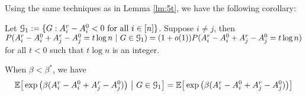 \documentclass{article}
\begin{document}
Using the same techniques as in Lemma \ref{lm:5t}, we have the following corollary:
\begin{corollary}\label{lem:ucBA}
Let $\mathcal{G}_1:=\{G:A^r_i-A^0_i<0\text{~for all~}i\in[n]\}$. Suppose $i\neq j$, then $P(A^r_i-A^0_i + A^r_j - A^0_j= t\log n~|~G\in\mathcal{G}_1)= (1+o(1))P(A^r_i-A^0_i + A^r_j - A^0_j= t\log n)$ for all $t<0$ such that $t\log n$ is an integer.
\end{corollary}
\begin{lemma}\label{lem:BijG}
	When $\beta < \beta^*$, we have
\begin{align}
\mathbb{E} \big[  \exp\big(\beta (A^r_i-A^0_i + A^r_j - A^0_j) \big) ~\big|~ G\in\mathcal{G}_1 \big] 
=\mathbb{E} \big[  \exp\big(\beta (A^r_i-A^0_i + A^r_j - A^0_j) \big) \big] 
\end{align}
\end{lemma}
\end{document}
